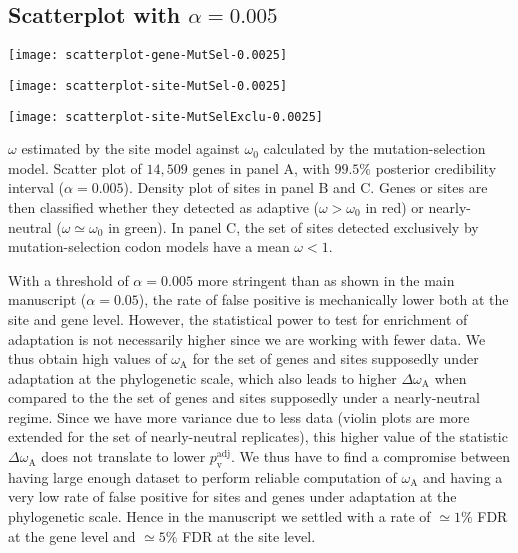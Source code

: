 \documentclass{article}
\renewcommand*{\bm}[1]{#1}%
\newcommand{\rateApop}{\omega_{\mathrm{A}}}
\begin{document}
    \subsection{Scatterplot with $\bm{\alpha=0.005}$}

    \begin{center}
        \begin{minipage}{0.32\linewidth}
            \texttt{[image: scatterplot-gene-MutSel-0.0025]}
        \end{minipage}
        \hfill
        \begin{minipage}{0.32\linewidth}
            \texttt{[image: scatterplot-site-MutSel-0.0025]}
        \end{minipage}
        \hfill
        \begin{minipage}{0.32\linewidth}
            \texttt{[image: scatterplot-site-MutSelExclu-0.0025]}
        \end{minipage}
        \hfill
    \end{center}

    $\omega$ estimated by the site model against $\omega_{0}$ calculated by the mutation-selection model.
    Scatter plot of $14,509$ genes in panel A, with $99.5$\% posterior credibility interval ($\alpha=0.005$).
    Density plot of sites in panel B and C.
    Genes or sites are then classified whether they detected as adaptive ($\omega > \omega_{0}$ in red) or nearly-neutral ($\omega \simeq \omega_{0}$ in green).
    In panel C, the set of sites detected exclusively by mutation-selection codon models have a mean $\omega < 1 $.

    \newpage
    

    With a threshold of $\alpha=0.005$ more stringent than as shown in the main manuscript ($\alpha=0.05$), the rate of false positive is mechanically lower both at the site and gene level.
    However, the statistical power to test for enrichment of adaptation is not necessarily higher since we are working with fewer data.
    We thus obtain high values of $\rateApop$ for the set of genes and sites supposedly under adaptation at the phylogenetic scale, which also leads to higher $\Delta \rateApop$ when compared to the the set of genes and sites supposedly under a nearly-neutral regime.
    Since we have more variance due to less data (violin plots are more extended for the set of nearly-neutral replicates), this higher value of the statistic $\Delta \rateApop$
    does not translate to lower $p_{\mathrm{v}}^{\mathrm{adj}}$.
    We thus have to find a compromise between having large enough dataset to perform reliable computation of $\rateApop$ and having a very low rate of false positive for sites and genes under adaptation at the phylogenetic scale.
    Hence in the manuscript we settled with a rate of $\simeq 1 \%$ FDR at the gene level and $\simeq 5 \%$ FDR at the site level.
\end{document}
